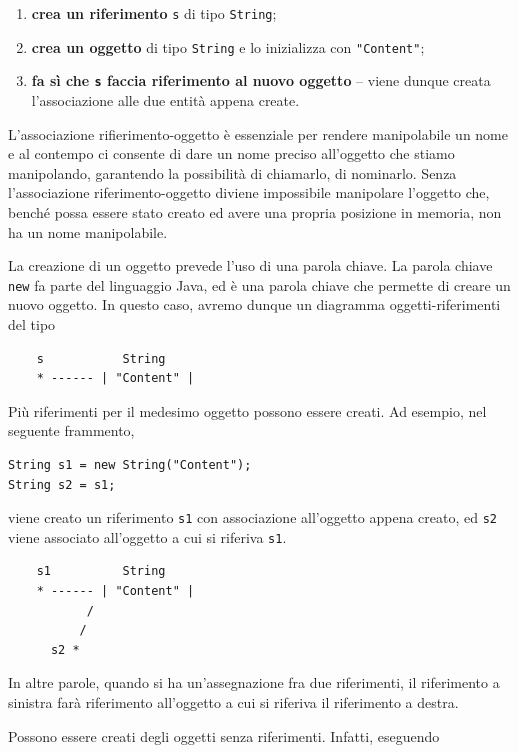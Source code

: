 \documentclass[\fontsizeclass,twocolumn]{\classname}
\theoremstyle{definition}
\theoremstyle{definition}
\begin{document}
\begin{enumerate}
	\item \textbf{crea un riferimento} \texttt{s} di tipo \texttt{String};
	\item \textbf{crea un oggetto} di tipo \texttt{String} e lo inizializza
		con \texttt{"Content"};
	\item \textbf{fa sì che \texttt{s} faccia riferimento al nuovo
		oggetto} \--- viene dunque creata l'associazione alle due
		entità appena create.
\end{enumerate}

L'associazione rifierimento-oggetto è essenziale per rendere manipolabile un
nome e al contempo ci consente di dare un nome preciso all'oggetto che stiamo
manipolando, garantendo la possibilità di chiamarlo, di nominarlo. Senza
l'associazione riferimento-oggetto diviene impossibile manipolare l'oggetto
che, benché possa essere stato creato ed avere una propria posizione in
memoria, non ha un nome manipolabile.

La creazione di un oggetto prevede l'uso di una parola chiave. La parola chiave
\texttt{new} fa parte del linguaggio Java, ed è una parola chiave che permette di
creare un nuovo oggetto. In questo caso, avremo dunque un diagramma
oggetti-riferimenti del tipo

\begin{verbatim}
    s           String
    * ------ | "Content" |
\end{verbatim}

Più riferimenti per il medesimo oggetto possono essere creati. Ad esempio, nel
seguente frammento,

\begin{lstlisting}
String s1 = new String("Content");
String s2 = s1;
\end{lstlisting}

viene creato un riferimento \texttt{s1} con associazione all'oggetto appena
creato, ed \texttt{s2} viene associato all'oggetto a cui si riferiva
\texttt{s1}.

\begin{verbatim}
    s1          String
    * ------ | "Content" |
           /
          /
      s2 *
\end{verbatim}

In altre parole, quando si ha un'assegnazione fra due riferimenti, il
riferimento a sinistra farà riferimento all'oggetto a cui si riferiva il
riferimento a destra.

Possono essere creati degli oggetti senza riferimenti. Infatti, eseguendo
\end{document}
